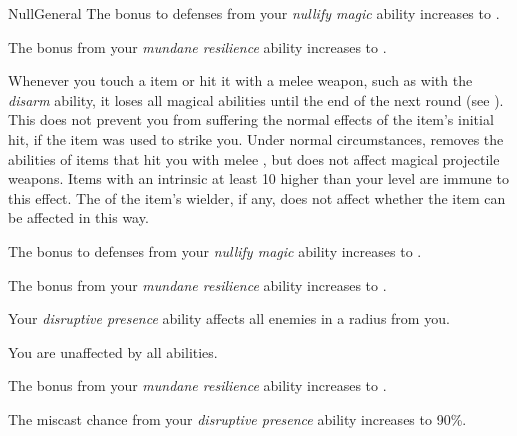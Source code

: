 \begin{feat}{Null}{General}
         The bonus to defenses from your \textit{nullify magic} ability increases to .

         The bonus from your \textit{mundane resilience} ability increases to .

         Whenever you touch a  item or hit it with a melee weapon, such as with the \textit{disarm} ability, it loses all magical abilities until the end of the next round (see ).
        This does not prevent you from suffering the normal effects of the item's initial hit, if the item was used to strike you.
        Under normal circumstances, removes the abilities of items that hit you with melee , but does not affect magical projectile weapons.
        Items with an intrinsic  at least 10 higher than your level are immune to this effect.
        The  of the item's wielder, if any, does not affect whether the item can be affected in this way.

         The bonus to defenses from your \textit{nullify magic} ability increases to .

         The bonus from your \textit{mundane resilience} ability increases to .

         Your \textit{disruptive presence} ability affects all enemies in a \areahuge radius  from you.

         You are unaffected by all  abilities.

         The bonus from your \textit{mundane resilience} ability increases to .

         The miscast chance from your \textit{disruptive presence} ability increases to 90\%.
    \end{feat}

